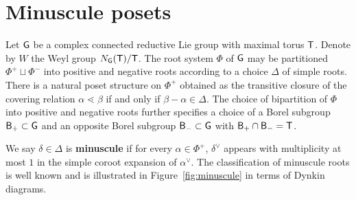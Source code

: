 \documentclass[12pt]{amsart}
\theoremstyle{definition}
\theoremstyle{remark}
\numberwithin{equation}{section}
\begin{document}
\section{Minuscule posets}\label{sec:minuscule}

Let ${\sf G}$ be a complex connected reductive Lie group with maximal torus ${\sf T}$. Denote by $W$ the Weyl group $N_{\sf G}({\sf T})/{\sf T}$. The root system $\Phi$ of ${\sf G}$ may be partitioned $\Phi^+ \sqcup \Phi^-$ into positive and negative roots according to a choice $\Delta$ of simple roots. There is a natural poset structure on $\Phi^+$ obtained as the transitive closure of the covering relation $\alpha \lessdot \beta$ if and only if $\beta - \alpha \in \Delta$. The choice of bipartition of $\Phi$ into positive and negative roots further specifies a choice of a Borel subgroup ${\sf B}_+ \subset {\sf G}$ and an opposite Borel subgroup ${\sf B}_- \subset {\sf G}$ with ${\sf B}_+ \cap {\sf B}_- = {\sf T}$.

We say $\delta \in \Delta$ is {\bf minuscule} if for every $\alpha \in \Phi^+$, $\delta^\vee$ appears with multiplicity at most $1$ in the simple coroot expansion of $\alpha^\vee$. The classification of minuscule roots is well known and is illustrated in Figure~\ref{fig:minuscule} in terms of Dynkin diagrams.
\end{document}
